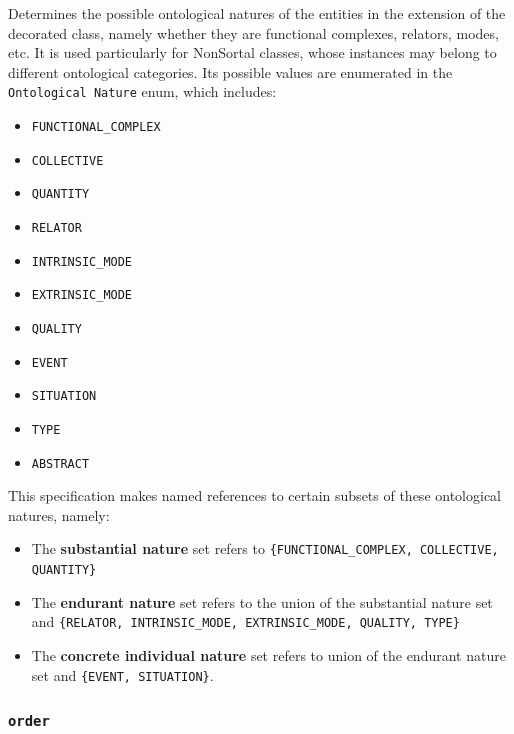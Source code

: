 Determines the possible ontological natures of the entities in the extension of the decorated class, namely whether they are functional complexes, relators, modes, etc. It is used particularly for NonSortal classes, whose instances may belong to different ontological categories. Its possible values are enumerated in the \texttt{Ontological Nature} enum, which includes: 
    \begin{itemize}
        \item \texttt{FUNCTIONAL\_COMPLEX}
        \item \texttt{COLLECTIVE}
        \item \texttt{QUANTITY}
        \item \texttt{RELATOR}
        \item \texttt{INTRINSIC\_MODE}
        \item \texttt{EXTRINSIC\_MODE}
        \item \texttt{QUALITY}
        \item \texttt{EVENT}
        \item \texttt{SITUATION}
        \item \texttt{TYPE}
        \item \texttt{ABSTRACT}
    \end{itemize}


This specification makes named references to certain subsets of these ontological natures, namely: 

\begin{itemize}

    \item {}\label{par:substantial-nature} The \textbf{substantial nature} set refers to \texttt{\{FUNCTIONAL\_COMPLEX, COLLECTIVE, QUANTITY\}}
    
    \item {}\label{par:endurant-nature} The \textbf{endurant nature} set refers to the union of the substantial nature set and \texttt{\{RELATOR, INTRINSIC\_MODE, EXTRINSIC\_MODE, QUALITY, TYPE\}}
    
    \item {}\label{par:concrete-individual-nature} The \textbf{concrete individual nature} set refers to union of the endurant nature set and \texttt{\{EVENT, SITUATION\}}.
\end{itemize}

\subsubsection{\texttt{order}}

